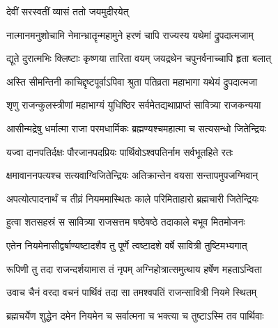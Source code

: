\begin{center}
\newcommand{\onelineindentedshloka}[2]{
    {#1\hspace{\shlokaspaceskip}}\\
\onelineshloka{\hspace{\shlokaspaceskip}#2}}


{देवीं सरस्वतीं व्यासं ततो जयमुदीरयेत्}



\twolineshloka
{नात्मानमनुशोचामि नेमान्भ्रातॄन्महामुने}
{हरणं चापि राज्यस्य यथेमां द्रुपदात्मजाम्}


\twolineshloka
{द्यूते दुरात्मभिः क्लिष्टाः कृष्णया तारिता वयम्}
{जयद्रथेन चपुनर्वनाच्चापि हृता बलात्}


\twolineshloka
{अस्ति सीमन्तिनी काचिद्दृष्टपूर्वाऽपिवा श्रुता}
{पतिव्रता महाभागा यथेयं द्रुपदात्मजा}




\twolineshloka
{शृणु राजन्कुलस्त्रीणां महाभाग्यं युधिष्ठिर}
{सर्वमेतद्यथाप्राप्तं सावित्र्या राजकन्यया}


\twolineshloka
{आसीन्मद्रेषु धर्मात्मा राजा परमधार्मिकः}
{ब्रह्मण्यश्चमहात्मा च सत्यसन्धो जितेन्द्रियः}


\twolineshloka
{यज्वा दानपतिर्दक्षः पौरजानपदप्रियः}
{पार्थिवोऽश्वपतिर्नाम सर्वभूतहिते रतः}


\twolineshloka
{क्षमावाननपत्यश्च सत्यवाग्विजितेन्द्रियः}
{अतिक्रान्तेन वयसा सन्तापमुपजग्मिवान्}


\twolineshloka
{अपत्योत्पादनार्थं च तीव्रं नियममास्थितः}
{काले परिमिताहारो ब्रह्मचारी जितेन्द्रियः}


\twolineshloka
{हुत्वा शतसहस्रं स सावित्र्या राजसत्तम}
{षष्ठेषष्ठे तदाकाले बभूव मितमोजनः}


\twolineshloka
{एतेन नियमेनासीद्वर्षाण्यष्टादशैव तु}
{पूर्णे त्वष्टादशे वर्षे सावित्री तुष्टिमभ्यगात्}


\twolineshloka
{रूपिणी तु तदा राजन्दर्शयामास तं नृपम्}
{अग्निहोत्रात्समुत्थाय हर्षेण महताऽन्विता}


\twolineshloka
{उवाच चैनं वरदा वचनं पार्थिवं तदा}
{सा तमश्वपतिं राजन्सावित्री नियमे स्थितम्}


\twolineshloka
{ब्रह्मचर्येण शुद्धेन दमेन नियमेन च}
{सर्वात्मना च भक्त्या च तुष्टाऽस्मि तव पार्थिवाः}



\end{center}
